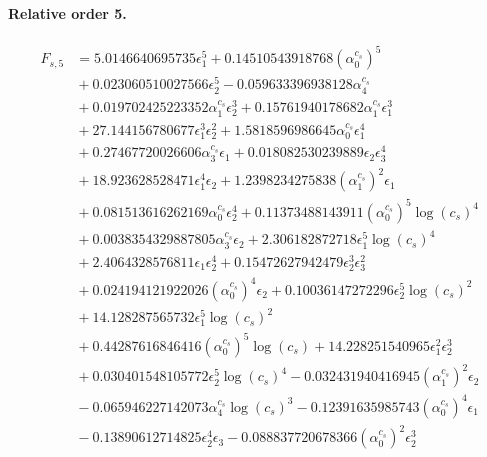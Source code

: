 \documentclass[10pt]{article}
\begin{document}
\paragraph{Relative order 5.}
\begin{align*}
F_{s,5} &= 5.0146640695735 \epsilon_{1}^{5} + 0.14510543918768 \left(\alpha_{0}^{c_s}\right)^{5} \\
&{}  + 0.023060510027566 \epsilon_{2}^{5} - 0.059633396938128 \alpha_{4}^{c_s} \\
&{}  + 0.019702425223352 \alpha_{1}^{c_s} \epsilon_{2}^{3} + 0.15761940178682 \alpha_{1}^{c_s} \epsilon_{1}^{3} \\
&{}  + 27.144156780677 \epsilon_{1}^{3} \epsilon_{2}^{2} + 1.5818596986645 \alpha_{0}^{c_s} \epsilon_{1}^{4} \\
&{}  + 0.27467720026606 \alpha_{3}^{c_s} \epsilon_{1} + 0.018082530239889 \epsilon_{2} \epsilon_{3}^{4} \\
&{}  + 18.923628528471 \epsilon_{1}^{4} \epsilon_{2} + 1.2398234275838 \left(\alpha_{1}^{c_s}\right)^{2} \epsilon_{1} \\
&{}  + 0.081513616262169 \alpha_{0}^{c_s} \epsilon_{2}^{4} + 0.11373488143911 \left(\alpha_{0}^{c_s}\right)^{5} \log{\left(c_{s} \right)}^{4} \\
&{}  + 0.0038354329887805 \alpha_{3}^{c_s} \epsilon_{2} + 2.306182872718 \epsilon_{1}^{5} \log{\left(c_{s} \right)}^{4} \\
&{}  + 2.4064328576811 \epsilon_{1} \epsilon_{2}^{4} + 0.15472627942479 \epsilon_{2}^{3} \epsilon_{3}^{2} \\
&{}  + 0.024194121922026 \left(\alpha_{0}^{c_s}\right)^{4} \epsilon_{2} + 0.10036147272296 \epsilon_{2}^{5} \log{\left(c_{s} \right)}^{2} \\
&{}  + 14.128287565732 \epsilon_{1}^{5} \log{\left(c_{s} \right)}^{2} \\
&{}  + 0.44287616846416 \left(\alpha_{0}^{c_s}\right)^{5} \log{\left(c_{s} \right)} + 14.228251540965 \epsilon_{1}^{2} \epsilon_{2}^{3} \\
&{}  + 0.030401548105772 \epsilon_{2}^{5} \log{\left(c_{s} \right)}^{4} - 0.032431940416945 \left(\alpha_{1}^{c_s}\right)^{2} \epsilon_{2} \\
&{}  - 0.065946227142073 \alpha_{4}^{c_s} \log{\left(c_{s} \right)}^{3} - 0.12391635985743 \left(\alpha_{0}^{c_s}\right)^{4} \epsilon_{1} \\
&{}  - 0.13890612714825 \epsilon_{2}^{4} \epsilon_{3} - 0.088837720678366 \left(\alpha_{0}^{c_s}\right)^{2} \epsilon_{2}^{3} \\

\end{align*}
\end{document}
